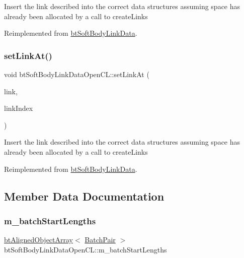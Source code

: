 Insert the link described into the correct data structures assuming space has already been allocated by a call to create\+Links 

Reimplemented from \hyperlink{classbtSoftBodyLinkData_a44f200dcb878405cebf3704dc7a8b8cd}{bt\+Soft\+Body\+Link\+Data}.

\mbox{\label{classbtSoftBodyLinkDataOpenCL_abef476a18a102fffd4dbb73ca2cfb9a4}} 
\subsubsection{\texorpdfstring{set\+Link\+At()}{setLinkAt()}\hspace{0.1cm}{\footnotesize\ttfamily [2/2]}}
{\footnotesize\ttfamily void bt\+Soft\+Body\+Link\+Data\+Open\+C\+L\+::set\+Link\+At (\begin{DoxyParamCaption}\item[{const \hyperlink{classbtSoftBodyLinkData_1_1LinkDescription}{Link\+Description} \&}]{link,  }\item[{int}]{link\+Index }\end{DoxyParamCaption})\hspace{0.3cm}{\ttfamily [virtual]}}

Insert the link described into the correct data structures assuming space has already been allocated by a call to create\+Links 

Reimplemented from \hyperlink{classbtSoftBodyLinkData_a44f200dcb878405cebf3704dc7a8b8cd}{bt\+Soft\+Body\+Link\+Data}.



\subsection{Member Data Documentation}
\mbox{\label{classbtSoftBodyLinkDataOpenCL_a112ca944380e035211dc6184a9f04312}} 
\subsubsection{\texorpdfstring{m\+\_\+batch\+Start\+Lengths}{m\_batchStartLengths}}
{\footnotesize\ttfamily \hyperlink{classbtAlignedObjectArray}{bt\+Aligned\+Object\+Array}$<$ \hyperlink{structbtSoftBodyLinkDataOpenCL_1_1BatchPair}{Batch\+Pair} $>$ bt\+Soft\+Body\+Link\+Data\+Open\+C\+L\+::m\+\_\+batch\+Start\+Lengths}

